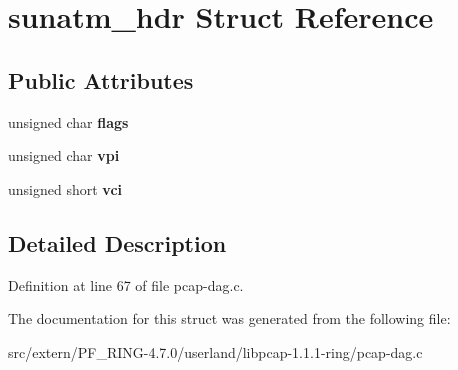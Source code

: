 \hypertarget{structsunatm__hdr}{
\section{sunatm\_\-hdr Struct Reference}
\label{structsunatm__hdr}
}
\subsection*{Public Attributes}
\begin{DoxyCompactItemize}
\item 
\hypertarget{structsunatm__hdr_ab5cbfb7a465bf7a62476fa2af2cbdefb}{
unsigned char {\bfseries flags}}
\label{structsunatm__hdr_ab5cbfb7a465bf7a62476fa2af2cbdefb}

\item 
\hypertarget{structsunatm__hdr_a7a7cdfbf5749a343b03abb6d3426ee46}{
unsigned char {\bfseries vpi}}
\label{structsunatm__hdr_a7a7cdfbf5749a343b03abb6d3426ee46}

\item 
\hypertarget{structsunatm__hdr_ac692d58cdb63ddfa6ffe8c3c133b304c}{
unsigned short {\bfseries vci}}
\label{structsunatm__hdr_ac692d58cdb63ddfa6ffe8c3c133b304c}

\end{DoxyCompactItemize}


\subsection{Detailed Description}


Definition at line 67 of file pcap-\/dag.c.



The documentation for this struct was generated from the following file:\begin{DoxyCompactItemize}
\item 
src/extern/PF\_\-RING-\/4.7.0/userland/libpcap-\/1.1.1-\/ring/pcap-\/dag.c\end{DoxyCompactItemize}

